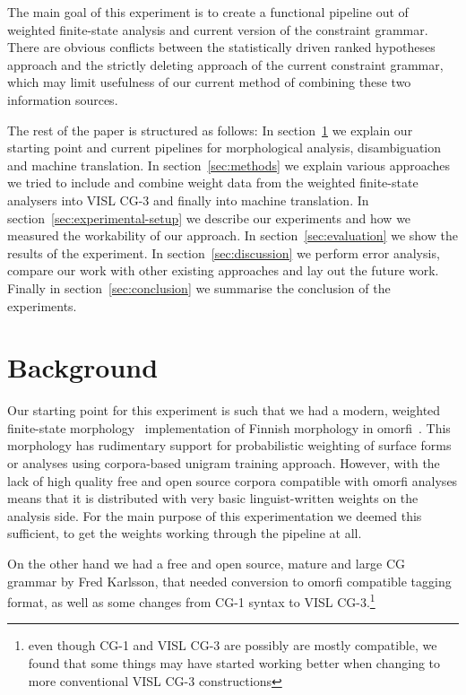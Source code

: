 \documentclass[11pt]{article}
\begin{document}
The main goal of this experiment is to create a functional
pipeline out of weighted finite-state analysis and current version of the
constraint grammar. There are obvious conflicts between the statistically
driven ranked hypotheses approach and the strictly deleting approach of the
current constraint grammar, which may limit usefulness of our current method
of combining these two information sources. 

The rest of the paper is structured as follows: In section~\ref{sec:background}
we explain our starting point and current pipelines for morphological analysis,
disambiguation and machine translation.  In section~\ref{sec:methods} we
explain various approaches we tried to include and combine weight data from
the weighted finite-state analysers into VISL CG-3 and finally into machine
translation. In section~\ref{sec:experimental-setup} we describe our
experiments and how we measured the workability of our approach. In
section~\ref{sec:evaluation} we show the results of the experiment. In
section~\ref{sec:discussion} we perform error analysis, compare our work with
other existing approaches and lay out the future work. Finally in 
section~\ref{sec:conclusion} we summarise the conclusion of the experiments.

\section{Background}
\label{sec:background}

Our starting point for this experiment is such that we had a modern, weighted
finite-state morphology~\cite{beesley2003finite,pirinen2008weighting} implementation of Finnish morphology in
omorfi~\cite{pirinen2015omorfi}. This morphology has rudimentary support for
probabilistic weighting of surface forms or analyses using corpora-based 
unigram training approach. However, with the lack of high quality free
and open source corpora compatible with omorfi analyses means that it is
distributed with very basic linguist-written weights on the analysis side.
For the main purpose of this experimentation we deemed this sufficient, to
get the weights working through the pipeline at all.

On the other hand we had a free and open source, mature and large CG grammar by
Fred Karlsson, that needed conversion to omorfi compatible tagging format, as
well as some changes from CG-1 syntax to VISL CG-3.\footnote{even though CG-1
    and VISL CG-3 are possibly are mostly compatible, we found that some things
may have started working better when changing to more conventional VISL CG-3
constructions} 
\end{document}
